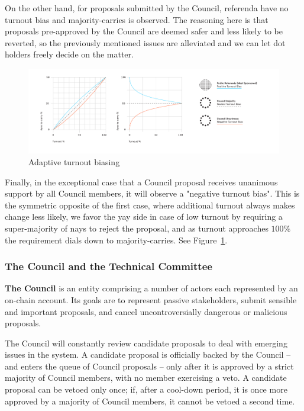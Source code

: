 On the other hand, for proposals submitted by the Council, referenda have no turnout bias and majority-carries is observed. The reasoning here is that proposals pre-approved by the Council are deemed safer and less likely to be reverted, so the previously mentioned issues are alleviated and we can let dot holders freely decide on the matter. 

\begin{figure}[h!]
  \centering
  \includegraphics[width=1.1\textwidth]{images/Turnout-Bias.png}
  \caption{Adaptive turnout biasing }
    \label{fig:biasing}
\end{figure}

Finally, in the exceptional case that a Council proposal receives unanimous support by all Council members, it will observe a "negative turnout bias". This is the symmetric opposite of the first case, where additional turnout always makes change less likely, we favor the yay side in case of low turnout by requiring a super-majority of nays to reject the proposal, and as turnout approaches $100\%$ the requirement dials down to majority-carries. See Figure~\ref{fig:biasing}.

\subsubsection{The Council and the Technical Committee}\label{s:council}

\textbf{The Council} is an entity comprising a number of actors each represented by an on-chain account. Its goals are to represent passive stakeholders, submit sensible and important proposals, and cancel uncontroversially dangerous or malicious proposals.

The Council will constantly review candidate proposals to deal with emerging issues in the system. A candidate proposal is officially backed by the Council -- and enters the queue of Council proposals -- only after it is approved by a strict majority of Council members, with no member exercising a veto. A candidate proposal can be vetoed only once; if, after a cool-down period, it is once more approved by a majority of Council members, it cannot be vetoed a second time. 

